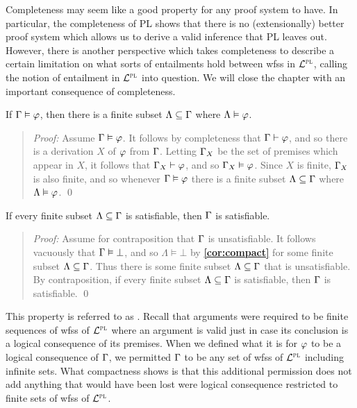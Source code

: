 Completeness may seem like a good property for any proof system to have.
In particular, the completeness of PL shows that there is no (extensionally) better proof system which allows us to derive a valid inference that PL leaves out.
However, there is another perspective which takes completeness to describe a certain limitation on what sorts of entailments hold between wfss in $\mathcal{L}^{\textsc{pl}}$, calling the notion of entailment in $\mathcal{L}^{\textsc{pl}}$ into question.
We will close the chapter with an important consequence of completeness.

\begin{Cthm} \label{cor:compact}
  If $\Gamma\vDash\varphi$, then there is a finite subset $\Lambda\subseteq\Gamma$ where $\Lambda\vDash\varphi$.
\end{Cthm} \vspace{-.2in}

\begin{quote} 
  \textit{Proof:} 
  Assume $\Gamma\vDash\varphi$.  
  It follows by completeness that $\Gamma\vdash\varphi$, and so there is a derivation $X$ of $\varphi$ from $\Gamma$.
  Letting $\Gamma_X$ be the set of premises which appear in $X$, it follows that $\Gamma_X\vdash\varphi$, and so $\Gamma_X\vDash\varphi$.
  Since $X$ is finite, $\Gamma_X$ is also finite, and so whenever $\Gamma\vDash\varphi$ there is a finite subset $\Lambda\subseteq\Gamma$ where $\Lambda\vDash\varphi$.
  \qed
\end{quote}



\begin{Cthm}[Compactness] \label{cor:compact2}
  If every finite subset $\Lambda\subseteq\Gamma$ is satisfiable, then $\Gamma$ is satisfiable.
\end{Cthm} \vspace{-.2in}

\begin{quote} 
  \textit{Proof:} 
  Assume for contraposition that $\Gamma$ is unsatisfiable. 
  It follows vacuously that $\Gamma\vDash\bot$, and so $\Lambda\vDash\bot$ by \textbf{\ref{cor:compact}} for some finite subset $\Lambda\subseteq\Gamma$.
  Thus there is some finite subset $\Lambda\subseteq\Gamma$ that is unsatisfiable. 
  By contraposition, if every finite subset $\Lambda\subseteq\Gamma$ is satisfiable, then $\Gamma$ is satisfiable. 
  \qed
\end{quote}


This property is referred to as .
Recall that arguments were required to be finite sequences of wfss of $\mathcal{L}^{\textsc{pl}}$ where an argument is valid just in case its conclusion is a logical consequence of its premises.
When we defined what it is for $\varphi$ to be a logical consequence of $\Gamma$, we permitted $\Gamma$ to be any set of wfss of $\mathcal{L}^{\textsc{pl}}$ including infinite sets. 
What compactness shows is that this additional permission does not add anything that would have been lost were logical consequence restricted to finite sets of wfss of $\mathcal{L}^{\textsc{pl}}$.

